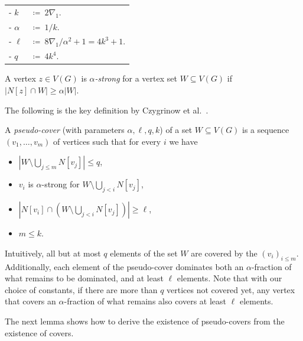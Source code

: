 \begin{tcolorbox}
\begin{tabular}{l l}
- $k$       & $\coloneqq~ 2\nabla_1$.\\
- $\alpha$  & $\coloneqq~ 1/k$.\\
- $\ell$    & $\coloneqq~ 8\nabla_1/\alpha^2+1=4k^3+1$.\\
- $q$       & $\coloneqq~ 4k^4$.
\end{tabular}
\end{tcolorbox}


\begin{definition}
A vertex $z\in V(G)$ is \emph{$\alpha$-strong} for a vertex set $W\subseteq V(G)$ if $|N[z]\cap W|\geq \alpha|W|$.
\end{definition}

The following is the key definition by Czygrinow et al.~\cite{czygrinow2018distributed}.

\begin{definition}
A \emph{pseudo-cover} (with parameters $\alpha, \ell, q, k$)
of a set $W\subseteq V(G)$ is a
sequence $(v_1,\ldots, v_m)$ of vertices
such that  for every $i$ we have
\begin{itemize}
\item $|W\setminus \bigcup_{j\le m}N[v_j]|\leq q$,
\item $v_i$ is $\alpha$-strong for $W\setminus\bigcup_{j<i}N[v_j]$,
\item $|N[v_i]\cap (W\setminus\bigcup_{j<i} N[v_j])|\geq \ell$,
\item $m\leq k$.
\end{itemize}
\end{definition}
Intuitively, all but at most $q$ elements of the set $W$ are covered by the $(v_i)_{i\le m}$.
Additionally, each element of the pseudo-cover dominates both an
$\alpha$-fraction of what remains to be dominated, and at least $\ell$ elements.
Note that with our choice of constants, if there are more than $q$ vertices not
covered yet, any vertex that covers an $\alpha$-fraction of what remains also
covers at least $\ell$ elements.


The next lemma shows how to derive the existence of pseudo-covers from
the existence of covers.

